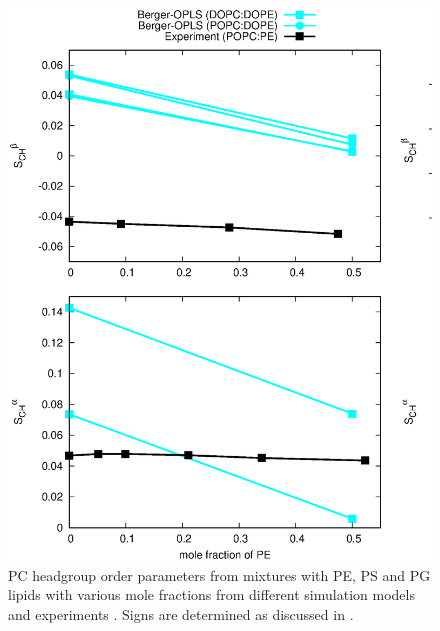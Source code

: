 \documentclass[aps,prl,superscriptaddress,twocolumn]{revtex4}
\begin{document}
\begin{figure}[]
  \centering
  \includegraphics[width=16.0cm]{../Figs/HGorderparametersPCvsPEPSPG.eps}
  \caption{\label{HGorderparametersPCvsPEPSPG}
    PC headgroup order parameters from mixtures with PE, PS and PG
    lipids with various mole fractions from different simulation models and experiments \cite{scherer87}.
    Signs are determined as discussed in \cite{botan15,ollila16}.
  }
\end{figure}
\end{document}
